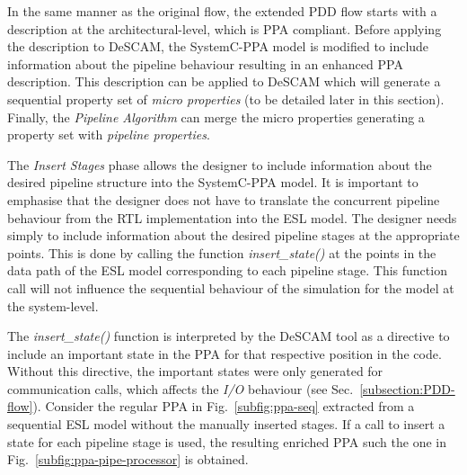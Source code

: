 In the same manner as the original flow, the extended PDD flow starts with a description at the architectural-level, which is PPA compliant. Before applying the description to DeSCAM, the SystemC-PPA model is modified to include information about the pipeline behaviour resulting in an enhanced PPA description. This description can be applied to DeSCAM which will generate a sequential property set of \textit{micro properties} (to be detailed later in this section). Finally, the \textit{Pipeline Algorithm} can merge the micro properties generating a property set with \textit{pipeline properties}.

The \textit{Insert Stages} phase allows the designer to include information about the desired pipeline structure into the SystemC-PPA model. It is important to emphasise that the designer does not have to translate the concurrent pipeline behaviour from the RTL implementation into the ESL model. The designer needs simply to include information about the desired pipeline stages at the appropriate points. This is done by calling the function \textit{insert\_state()} at the points in the data path of the ESL model corresponding to each pipeline stage. This function call will not influence the sequential behaviour of the simulation for the model at the system-level.

The \textit{insert\_state()} function is interpreted by the DeSCAM tool as a directive to include an important state in the PPA for that respective position in the code. Without this directive, the important states were only generated for communication calls, which affects the \textit{I/O} behaviour (see Sec.~\ref{subsection:PDD-flow}). Consider the regular PPA in Fig.~\ref{subfig:ppa-seq} extracted from a sequential ESL model without the manually inserted stages. If a call to insert a state for each pipeline stage is used, the resulting enriched PPA such the one in Fig.~\ref{subfig:ppa-pipe-processor} is obtained.

